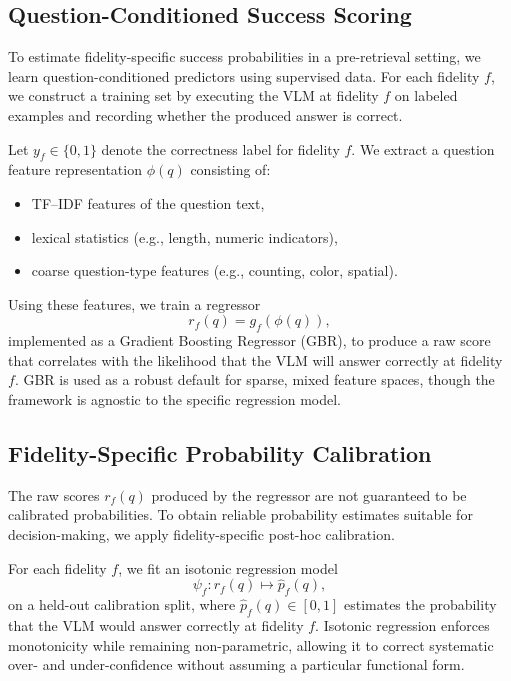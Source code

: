 \subsection{Question-Conditioned Success Scoring}

To estimate fidelity-specific success probabilities in a pre-retrieval setting, we learn
question-conditioned predictors using supervised data.
For each fidelity $f$, we construct a training set by executing the VLM at fidelity $f$
on labeled examples and recording whether the produced answer is correct.

Let $y_f \in \{0,1\}$ denote the correctness label for fidelity $f$.
We extract a question feature representation $\phi(q)$ consisting of:
\begin{itemize}
    \item TF--IDF features of the question text,
    \item lexical statistics (e.g., length, numeric indicators),
    \item coarse question-type features (e.g., counting, color, spatial).
\end{itemize}

Using these features, we train a regressor
\[
r_f(q) = g_f(\phi(q)),
\]
implemented as a Gradient Boosting Regressor (GBR), to produce a raw score that correlates
with the likelihood that the VLM will answer correctly at fidelity $f$.
GBR is used as a robust default for sparse, mixed feature spaces, though the framework is
agnostic to the specific regression model.



\subsection{Fidelity-Specific Probability Calibration}

The raw scores $r_f(q)$ produced by the regressor are not guaranteed to be calibrated
probabilities.
To obtain reliable probability estimates suitable for decision-making, we apply
fidelity-specific post-hoc calibration.

For each fidelity $f$, we fit an isotonic regression model
\[
\psi_f: r_f(q) \mapsto \hat{p}_f(q),
\]
on a held-out calibration split, where $\hat{p}_f(q) \in [0,1]$ estimates the probability
that the VLM would answer correctly at fidelity $f$.
Isotonic regression enforces monotonicity while remaining non-parametric, allowing it to
correct systematic over- and under-confidence without assuming a particular functional
form.

